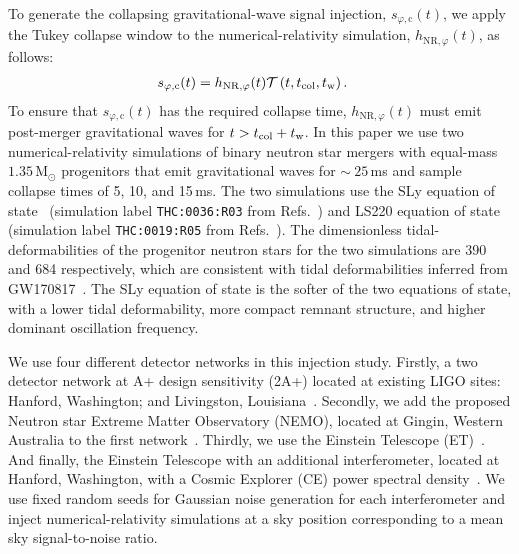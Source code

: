 \documentclass[../Thesis.tex]{subfiles}
\begin{document}
    To generate the collapsing gravitational-wave signal injection, $s_{\varphi,\mathrm{c}}(t)$, we apply the Tukey collapse window to the numerical-relativity simulation, $h_{\mathrm{NR},\varphi}(t)$, as follows: 
    \begin{align}
        s_{\varphi,\mathrm{c}}(t) & =  h_{\mathrm{NR},\varphi}(t)\mathcal{T}\left(t , t_{\mathrm{col}},t_{\mathrm{w}}\right). \label{eq:scol3}
    \end{align}
    To ensure that $s_{\varphi,\mathrm{c}}(t)$ has the required collapse time, $h_{\mathrm{NR},\varphi}(t)$ must emit post-merger gravitational waves for $t>t_{\mathrm{col}}+t_{\mathrm{w}}$.
    In this paper we use two numerical-relativity simulations of binary neutron star mergers with equal-mass $1.35\,\mathrm{M}_\odot$ progenitors that emit gravitational waves for $\sim~25$\,ms and sample collapse times of 5, 10, and 15\,ms.
    The two simulations use the SLy equation of state~\cite{Douchin2001} (simulation label \texttt{THC:0036:R03} from Refs.~\cite{Dietrich2018,Radice2016}) and LS220 equation of state~\cite{Lattimer1991} (simulation label \texttt{THC:0019:R05} from Refs.~\cite{Dietrich2018,Radice2017}).
    The dimensionless tidal-deformabilities of the progenitor neutron stars for the two simulations are 390 and 684 respectively, which are consistent with tidal deformabilities inferred from GW170817~\cite{GW170817Properties}.
    The SLy equation of state is the softer of the two equations of state, with a lower tidal deformability, more compact remnant structure, and higher dominant oscillation frequency.\par
    
    We use four different detector networks in this injection study.
    Firstly, a two detector network at A+ design sensitivity (2A+) located at existing LIGO sites: Hanford, Washington; and Livingston, Louisiana~\cite{Abbott2020Prospects,PSD:Aplus}. 
    Secondly, we add the proposed Neutron star Extreme Matter Observatory (NEMO), located at Gingin, Western Australia to the first network~\cite{NEMO2020}.
    Thirdly, we use the Einstein Telescope (ET)~\cite{Hild2008,Punturo2010,Hild2011, PSD:ET}.
    And finally, the Einstein Telescope with an additional interferometer, located at Hanford, Washington, with a Cosmic Explorer (CE) power spectral density~\cite{Abbott2017b, Adhikari2019,PSD:CE}.
    We use fixed random seeds for Gaussian noise generation for each interferometer and inject numerical-relativity simulations at a sky position corresponding to a mean sky signal-to-noise ratio. 
    \par
      
\end{document}
